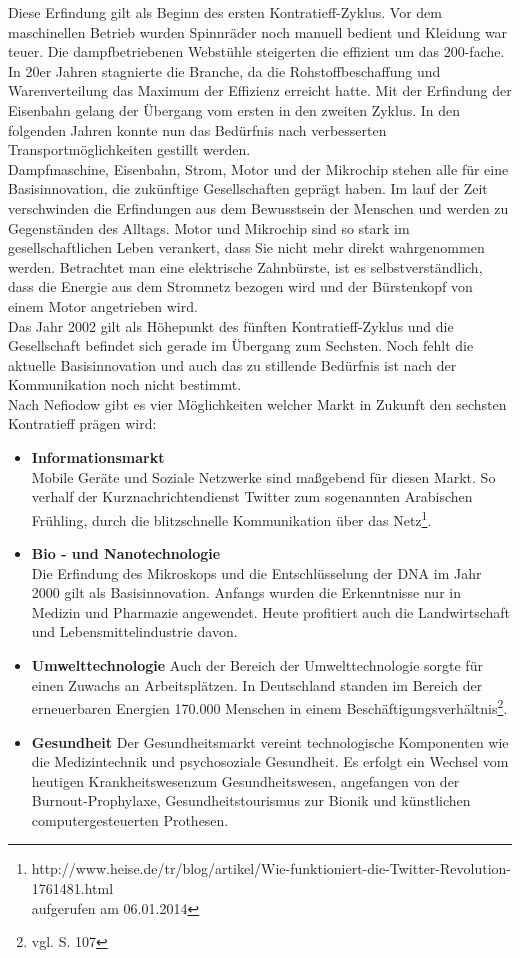 Diese Erfindung gilt als Beginn des ersten Kontratieff-Zyklus. Vor dem maschinellen Betrieb wurden Spinnräder noch manuell bedient und Kleidung war teuer. Die dampfbetriebenen Webstühle steigerten
die effizient um das 200-fache. In 20er Jahren stagnierte die Branche, da die Rohstoffbeschaffung und Warenverteilung das Maximum der Effizienz erreicht hatte. Mit der Erfindung der Eisenbahn gelang der Übergang vom ersten in den zweiten Zyklus. In den folgenden Jahren konnte nun das Bedürfnis nach verbesserten Transportmöglichkeiten gestillt werden.\\
Dampfmaschine, Eisenbahn, Strom, Motor und der Mikrochip stehen alle für eine Basisinnovation, die zukünftige Gesellschaften geprägt haben. Im lauf der Zeit verschwinden die Erfindungen aus dem Bewusstsein der Menschen und werden zu Gegenständen des Alltags. Motor und Mikrochip sind so stark im gesellschaftlichen Leben verankert, dass Sie nicht mehr direkt wahrgenommen werden. Betrachtet man eine elektrische Zahnbürste, ist es selbstverständlich, dass die Energie aus dem Stromnetz bezogen wird und der Bürstenkopf von einem Motor angetrieben wird.\\
Das Jahr 2002 gilt als Höhepunkt des fünften Kontratieff-Zyklus und die Gesellschaft befindet sich gerade im Übergang zum Sechsten. Noch fehlt die aktuelle Basisinnovation und auch das zu stillende Bedürfnis ist nach der Kommunikation noch nicht bestimmt.\\
Nach Nefiodow \cite{nefiodow:gesundheit} gibt es vier Möglichkeiten welcher Markt in Zukunft den sechsten Kontratieff prägen wird:
\begin{itemize}
  \item \textbf{Informationsmarkt} \\
  		Mobile Geräte und Soziale Netzwerke sind maßgebend für diesen Markt. So verhalf der Kurznachrichtendienst Twitter zum sogenannten \glqq Arabischen Frühling\grqq, durch die blitzschnelle Kommunikation über das Netz\footnote{http://www.heise.de/tr/blog/artikel/Wie-funktioniert-die-Twitter-Revolution-1761481.html \\aufgerufen am 06.01.2014}.
  \item \textbf{Bio - und Nanotechnologie} \\
  		Die Erfindung des Mikroskops und die Entschlüsselung der DNA im Jahr 2000 gilt als Basisinnovation. Anfangs wurden die Erkenntnisse nur in Medizin und Pharmazie angewendet. Heute profitiert auch die Landwirtschaft und Lebensmittelindustrie davon.
  \item \textbf{Umwelttechnologie}
  		Auch der Bereich der Umwelttechnologie sorgte für einen Zuwachs an Arbeitsplätzen. In Deutschland standen im Bereich der erneuerbaren Energien 170.000 Menschen in einem Beschäftigungsverhältnis\footnote{vgl. \cite{nefiodow:gesundheit} S. 107}.
  \item \textbf{Gesundheit}
  		Der Gesundheitsmarkt vereint technologische Komponenten wie die Medizintechnik und psychosoziale Gesundheit. Es erfolgt ein Wechsel vom heutigen \glqq Krankheitswesen\grqq zum Gesundheitswesen, angefangen von der Burnout-Prophylaxe, Gesundheitstourismus zur Bionik und künstlichen computergesteuerten Prothesen.
\end{itemize}

